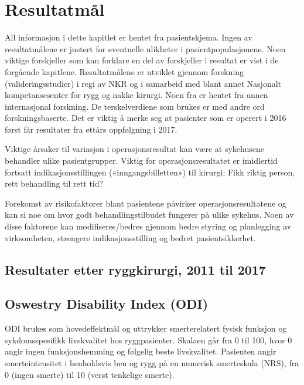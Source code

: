 \documentclass [norsk,a4paper,twoside]{article}\usepackage[]{graphicx}\usepackage[]{color}
\begin{document}
\section{Resultatmål}
All informasjon i dette kapitlet er hentet fra pasientskjema. Ingen av resultatmålene er justert
for eventuelle ulikheter i pasientpopulasjonene. Noen viktige forskjeller som kan forklare en del av forskjeller i resultat er vist i de forgående kapitlene.
Resultatmålene er utviklet gjennom forskning (valideringsstudier) i regi av NKR og i samarbeid
med blant annet Nasjonalt kompetansesenter for rygg og nakke kirurgi. Noen fra er hentet fra annen
internasjonal forskning. De terskelverdiene som brukes er med andre ord forskningsbaserte. 
Det er viktig å merke seg at pasienter som er operert i 2016 først får resultater fra ettårs oppfølgning i 2017. 

Viktige årsaker til variasjon i operasjonsresultat kan være at sykehusene behandler
ulike pasientgrupper. Viktig for operasjonsresultatet er imidlertid fortsatt
indikasjonsstillingen («inngangsbilletten») til kirurgi; Fikk riktig person, rett
behandling til rett tid?
      
      Forekomst av risikofaktorer blant pasientene påvirker operasjonsresultatene og kan
si noe om hvor godt behandlingstilbudet fungerer på ulike sykehus. Noen av disse
faktorene kan modifiseres/bedres gjennom bedre styring og planlegging av
virksomheten, strengere indikasjonsstilling og bedret pasientsikkerhet.


      
      
      \subsection{ Resultater etter ryggkirurgi, 2011 til 2017}

\subsection{Oswestry Disability Index (ODI)}


      
      
      
      ODI brukes som hovedeffektmål og uttrykker smerterelatert fysisk funksjon og sykdomsspesifikk livskvalitet hos ryggpasienter. Skalaen går fra 0
til 100, hvor 0 angir ingen funksjonshemming og følgelig beste livskvalitet.
Pasienten angir smerteintensitet i henholdsvis ben og rygg på en numerisk smerteskala (NRS), 
fra 0 (ingen smerte) til 10 (verst tenkelige smerte).
\\
\end{document}
